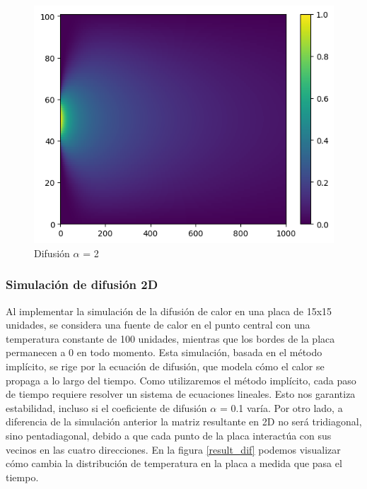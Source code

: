 \begin{figure}[H]
  \begin{minipage}[b]{0.5\linewidth}
    \centering
    \includegraphics[width=.5\linewidth]{./img/alfa2.png}
  \caption{Difusión $\alpha$ = 2}\label{fig:result_dif}
    \vspace{4ex}
  \end{minipage} 
\end{figure}








\subsubsection{Simulación de difusión 2D}

Al implementar la simulación de la difusión de calor en una placa de 15x15 unidades, se considera una fuente de calor en el punto central con una temperatura constante de 100 unidades, mientras que los bordes de la placa permanecen a 0 en todo momento. Esta simulación, basada en el método implícito, se rige por la ecuación de difusión, que modela cómo el calor se propaga a lo largo del tiempo.
 Como utilizaremos el método implícito, cada paso de tiempo requiere resolver un sistema de ecuaciones lineales. Esto nos garantiza estabilidad, incluso si el coeficiente de difusión $\alpha$ = 0.1 varía.
Por otro lado, a diferencia de la simulación anterior la matriz resultante en 2D no será tridiagonal, sino pentadiagonal, debido a que cada punto de la placa interactúa con sus vecinos en las cuatro direcciones.
En la figura \ref{result_dif} podemos visualizar cómo cambia la distribución de temperatura en la placa a medida que pasa el tiempo.

